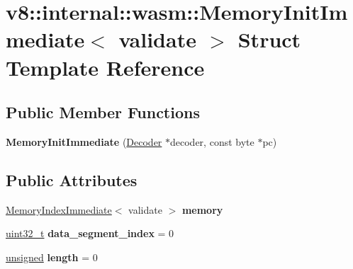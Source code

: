 \hypertarget{structv8_1_1internal_1_1wasm_1_1MemoryInitImmediate}{}\section{v8\+:\+:internal\+:\+:wasm\+:\+:Memory\+Init\+Immediate$<$ validate $>$ Struct Template Reference}
\label{structv8_1_1internal_1_1wasm_1_1MemoryInitImmediate}
\subsection*{Public Member Functions}
\begin{DoxyCompactItemize}
\item 
\mbox{\label{structv8_1_1internal_1_1wasm_1_1MemoryInitImmediate_ab19fa10b1e842afb4e668234ce5f1336}} 
{\bfseries Memory\+Init\+Immediate} (\mbox{\hyperlink{classv8_1_1internal_1_1wasm_1_1Decoder}{Decoder}} $\ast$decoder, const byte $\ast$pc)
\end{DoxyCompactItemize}
\subsection*{Public Attributes}
\begin{DoxyCompactItemize}
\item 
\mbox{\label{structv8_1_1internal_1_1wasm_1_1MemoryInitImmediate_a7d2fde8fea2766070e20e57295612a88}} 
\mbox{\hyperlink{structv8_1_1internal_1_1wasm_1_1MemoryIndexImmediate}{Memory\+Index\+Immediate}}$<$ validate $>$ {\bfseries memory}
\item 
\mbox{\label{structv8_1_1internal_1_1wasm_1_1MemoryInitImmediate_afe89f3a031509b6a8d60acc22212472f}} 
\mbox{\hyperlink{classuint32__t}{uint32\+\_\+t}} {\bfseries data\+\_\+segment\+\_\+index} = 0
\item 
\mbox{\label{structv8_1_1internal_1_1wasm_1_1MemoryInitImmediate_a98f23c460313134ab96084d27b9d5b89}} 
\mbox{\hyperlink{classunsigned}{unsigned}} {\bfseries length} = 0
\end{DoxyCompactItemize}


